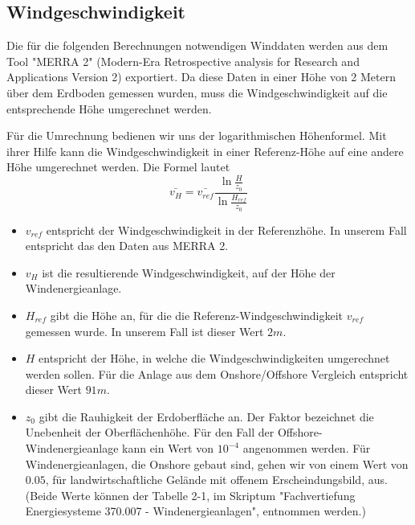 \documentclass[a4paper,12pt]{article}
\begin{document}
	\subsection{Windgeschwindigkeit}
	Die für die folgenden Berechnungen notwendigen Winddaten werden aus dem Tool "MERRA 2" (Modern-Era Retrospective analysis for Research and Applications Version 2) exportiert. Da diese Daten in einer Höhe von 2 Metern über dem Erdboden gemessen wurden, muss die Windgeschwindigkeit auf die entsprechende Höhe umgerechnet werden.\\ \par
	\noindent Für die Umrechnung bedienen wir uns der logarithmischen Höhenformel. Mit ihrer Hilfe kann die Windgeschwindigkeit in einer Referenz-Höhe auf eine andere Höhe umgerechnet werden.
	\newline Die Formel lautet
	\begin{equation}
	\bar{v_H} = \bar{v_{ref}}\frac{\ln{\frac{H}{z_0}}}{\ln{\frac{H_{ref}}{z_0}}}
	\end{equation}
	\begin{itemize}
		\item $v_{ref}$ entspricht der Windgeschwindigkeit in der Referenzhöhe. In unserem Fall entspricht das den Daten aus MERRA 2.
		\item $v_H$ ist die resultierende Windgeschwindigkeit, auf der Höhe der Windenergieanlage.
		\item $H_{ref}$ gibt die Höhe an, für die die Referenz-Windgeschwindigkeit $v_{ref}$ gemessen wurde. In unserem Fall ist dieser Wert $2m$.
		\item $H$ entspricht der Höhe, in welche die Windgeschwindigkeiten umgerechnet werden sollen. Für die Anlage aus dem Onshore/Offshore Vergleich entspricht dieser Wert $91m$.
		\item $z_0$ gibt die Rauhigkeit der Erdoberfläche an. Der Faktor bezeichnet die Unebenheit der Oberflächenhöhe. Für den Fall der Offshore-Windenergieanlage kann ein Wert von $10^{-4}$ angenommen werden. Für Windenergieanlagen, die Onshore gebaut sind, gehen wir von einem Wert von $0.05$, für landwirtschaftliche Gelände mit offenem Erscheindungsbild, aus. (Beide Werte können der Tabelle 2-1, im Skriptum "Fachvertiefung Energiesysteme 370.007 -  Windenergieanlagen", entnommen werden.)
	\end{itemize}
\end{document}
